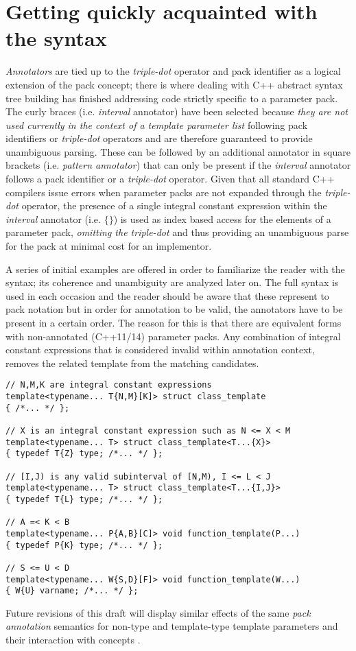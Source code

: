 \section{Getting quickly acquainted with the syntax}
\p \textit{Annotators} are tied up to the \textit{triple-dot} operator and pack identifier as a logical extension of the pack concept; there is where dealing with C++ abstract syntax tree building has finished addressing code strictly specific to a parameter pack.
The curly braces (i.e. \textit{interval} annotator) have been selected because \textit{they are not used currently in the context of a template parameter list} following pack identifiers or \textit{triple-dot} operators and are therefore guaranteed to provide unambiguous parsing.
These can be followed by an additional annotator in square brackets (i.e. \textit{pattern annotator}) that can only be present if the \textit{interval} annotator follows a pack identifier or a \textit{triple-dot} operator.
Given that all standard C++ compilers issue errors when parameter packs are not expanded through the \textit{triple-dot} operator, the presence of a single integral constant expression within the \textit{interval} annotator (i.e. $\{\}$) is used as index based access for the elements of a parameter pack, \textit{omitting the triple-dot} and thus providing an unambiguous parse for the pack at minimal cost for an implementor.

\p A series of initial examples are offered in order to familiarize the reader with the syntax; its coherence and unambiguity are analyzed later on.
The full syntax is used in each occasion and the reader should be aware that these represent  to pack notation but in order for annotation to be valid, the annotators have to be present in a certain order.
The reason for this is that there are equivalent forms with non-annotated (C++11/14) parameter packs.
Any combination of integral constant expressions that is considered invalid within annotation context, removes the related template from the matching candidates.

\begin{verbatim}
// N,M,K are integral constant expressions
template<typename... T{N,M}[K]> struct class_template
{ /*... */ };

// X is an integral constant expression such as N <= X < M
template<typename... T> struct class_template<T...{X}>
{ typedef T{Z} type; /*... */ };

// [I,J) is any valid subinterval of [N,M), I <= L < J
template<typename... T> struct class_template<T...{I,J}>
{ typedef T{L} type; /*... */ };

// A =< K < B
template<typename... P{A,B}[C]> void function_template(P...)
{ typedef P{K} type; /*... */ };

// S <= U < D
template<typename... W{S,D}[F]> void function_template(W...)
{ W{U} varname; /*... */ };

\end{verbatim}

\p Future revisions of this draft will display similar effects of the same \textit{pack annotation} semantics for non-type and template-type template parameters and their interaction with concepts \cite{Stroustrup2012,Sutton2013}.
\newpage

